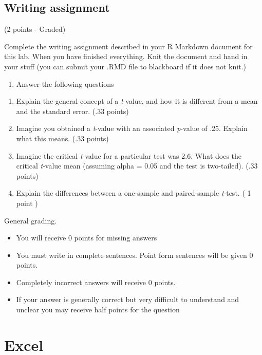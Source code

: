 \documentclass[
]{book}
\providecommand{\tightlist}{%
  \setlength{\itemsep}{0pt}\setlength{\parskip}{0pt}}
\begin{document}
\hypertarget{writing-assignment-2}{%
\subsection{Writing assignment}\label{writing-assignment-2}}

(2 points - Graded)

Complete the writing assignment described in your R Markdown document for this lab. When you have finished everything. Knit the document and hand in your stuff (you can submit your .RMD file to blackboard if it does not knit.)

\begin{enumerate}
\def\labelenumi{\arabic{enumi}.}
\tightlist
\item
  Answer the following questions
\end{enumerate}

\begin{enumerate}
\def\labelenumi{\alph{enumi}.}
\item
  Explain the general concept of a \emph{t}-value, and how it is different from a mean and the standard error. (.33 points)
\item
  Imagine you obtained a \emph{t}-value with an associated \emph{p}-value of .25. Explain what this means. (.33 points)
\item
  Imagine the critical \emph{t}-value for a particular test was 2.6. What does the critical \emph{t}-value mean (assuming alpha = 0.05 and the test is two-tailed). (.33 points)
\item
  Explain the differences between a one-sample and paired-sample \emph{t}-test. ( 1 point )
\end{enumerate}

General grading.

\begin{itemize}
\tightlist
\item
  You will receive 0 points for missing answers
\item
  You must write in complete sentences. Point form sentences will be given 0 points.
\item
  Completely incorrect answers will receive 0 points.
\item
  If your answer is generally correct but very difficult to understand and unclear you may receive half points for the question
\end{itemize}

\hypertarget{excel-4}{%
\section{Excel}\label{excel-4}}
\end{document}
